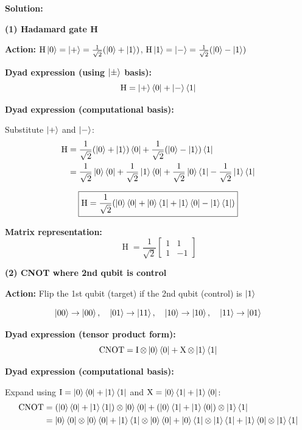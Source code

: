\documentclass[11pt]{article}
\newenvironment{solution}
{\par\noindent\textbf{Solution:}\par}
{\vspace{1em}}
\begin{document}
\begin{solution}

\textbf{(1) Hadamard gate H}

\textbf{Action:} $\operatorname{H}\ket{0} = \ket{+} = \frac{1}{\sqrt{2}}(\ket{0} + \ket{1})$, $\operatorname{H}\ket{1} = \ket{-} = \frac{1}{\sqrt{2}}(\ket{0} - \ket{1})$

\textbf{Dyad expression (using $\ket{\pm}$ basis):}
\[\operatorname{H} = \ket{+}\bra{0} + \ket{-}\bra{1}\]

\textbf{Dyad expression (computational basis):}

Substitute $\ket{+}$ and $\ket{-}$:
\[\begin{aligned}
\operatorname{H} &= \frac{1}{\sqrt{2}}(\ket{0} + \ket{1})\bra{0} + \frac{1}{\sqrt{2}}(\ket{0} - \ket{1})\bra{1} \\
&= \frac{1}{\sqrt{2}}\ket{0}\bra{0} + \frac{1}{\sqrt{2}}\ket{1}\bra{0} + \frac{1}{\sqrt{2}}\ket{0}\bra{1} - \frac{1}{\sqrt{2}}\ket{1}\bra{1}
\end{aligned}\]

\[\boxed{\operatorname{H} = \frac{1}{\sqrt{2}}(\ket{0}\bra{0} + \ket{0}\bra{1} + \ket{1}\bra{0} - \ket{1}\bra{1})}\]

\textbf{Matrix representation:}
\[\boxed{\operatorname{H} = \frac{1}{\sqrt{2}}\begin{bmatrix}1 & 1 \\ 1 & -1\end{bmatrix}}\]

\textbf{(2) CNOT where 2nd qubit is control}

\textbf{Action:} Flip the 1st qubit (target) if the 2nd qubit (control) is $\ket{1}$

\[\ket{00} \to \ket{00}, \quad \ket{01} \to \ket{11}, \quad \ket{10} \to \ket{10}, \quad \ket{11} \to \ket{01}\]

\textbf{Dyad expression (tensor product form):}
\[\operatorname{CNOT} = \operatorname{I} \otimes \ket{0}\bra{0} + \operatorname{X} \otimes \ket{1}\bra{1}\]

\textbf{Dyad expression (computational basis):}

Expand using $\operatorname{I} = \ket{0}\bra{0} + \ket{1}\bra{1}$ and $\operatorname{X} = \ket{0}\bra{1} + \ket{1}\bra{0}$:
\[\begin{aligned}
\operatorname{CNOT} &= (\ket{0}\bra{0} + \ket{1}\bra{1}) \otimes \ket{0}\bra{0} + (\ket{0}\bra{1} + \ket{1}\bra{0}) \otimes \ket{1}\bra{1} \\
&= \ket{0}\bra{0} \otimes \ket{0}\bra{0} + \ket{1}\bra{1} \otimes \ket{0}\bra{0} + \ket{0}\bra{1} \otimes \ket{1}\bra{1} + \ket{1}\bra{0} \otimes \ket{1}\bra{1}
\end{aligned}\]


\end{solution}
\end{document}
